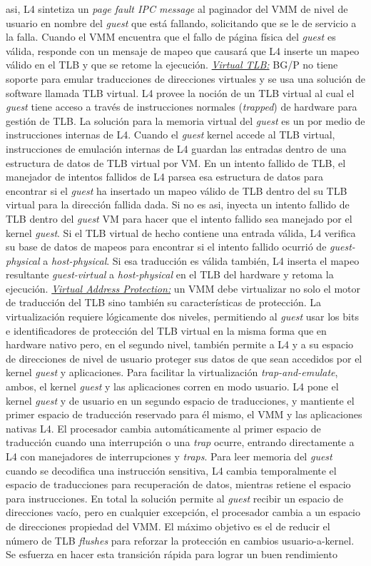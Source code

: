 asi, L4 sintetiza un \emph{page fault IPC message} al paginador del VMM de nivel de usuario en nombre del \emph{guest} que está fallando, solicitando que se le de servicio a la falla. Cuando el VMM encuentra que el fallo de página física del \emph{guest} es válida, responde con un mensaje de mapeo que causará que L4 inserte un mapeo válido en el TLB y que se retome la ejecución. \underline{\emph{Virtual TLB:}} BG/P no tiene soporte para emular traducciones de direcciones virtuales y se usa una solución de software llamada TLB virtual. L4 provee la noción de un TLB virtual al cual el \emph{guest} tiene acceso a través de instrucciones normales (\emph{trapped}) de hardware para gestión de TLB. La solución para la memoria virtual del \emph{guest} es un por medio de instrucciones internas de L4. Cuando el \emph{guest} kernel accede al TLB virtual, instrucciones de emulación internas de L4 guardan las entradas dentro de una estructura de datos de TLB virtual por VM. En un intento fallido de TLB, el manejador de intentos fallidos de L4 parsea esa estructura de datos para encontrar si el \emph{guest} ha insertado un mapeo válido de TLB dentro del su TLB virtual para la dirección fallida dada. Si no es asi, inyecta un intento fallido de TLB dentro del \emph{guest} VM para hacer que el intento fallido sea manejado por el kernel \emph{guest}. Si el TLB virtual de hecho contiene una entrada válida, L4 verifica su base de datos de mapeos para encontrar si el intento fallido ocurrió de \emph{guest-physical} a \emph{host-physical}. Si esa traducción es válida también, L4 inserta el mapeo resultante \emph{guest-virtual} a \emph{host-physical} en el TLB del hardware y retoma la ejecución. \underline{\emph{Virtual Address Protection:}} un VMM debe virtualizar no solo el motor de traducción del TLB sino también su características de protección. La virtualización requiere lógicamente dos niveles, permitiendo al \emph{guest} usar los bits e identificadores de protección del TLB virtual en la misma forma que en hardware nativo pero, en el segundo nivel, también permite a L4 y a su espacio de direcciones de nivel de usuario proteger sus datos de que sean accedidos por el kernel \emph{guest} y aplicaciones. Para facilitar la virtualización \emph{trap-and-emulate}, ambos, el kernel \emph{guest} y las aplicaciones corren en modo usuario. L4 pone el kernel \emph{guest} y de usuario en un segundo espacio de traducciones, y mantiente el primer espacio de traducción reservado para él mismo, el VMM y las aplicaciones nativas L4. El procesador cambia automáticamente al primer espacio de traducción cuando una interrupción o una \emph{trap} ocurre, entrando directamente a L4 con manejadores de interrupciones y \emph{traps}. Para leer memoria del \emph{guest} cuando se decodifica una instrucción sensitiva, L4 cambia temporalmente el espacio de traducciones para recuperación de datos, mientras retiene el espacio para instrucciones. En total la solución permite al \emph{guest} recibir un espacio de direcciones vacío, pero en cualquier excepción, el procesador cambia a un espacio de direcciones propiedad del VMM. El máximo objetivo es el de reducir el número de TLB \emph{flushes} para reforzar la protección en cambios usuario-a-kernel. Se esfuerza en hacer esta transición rápida para lograr un buen rendimiento 